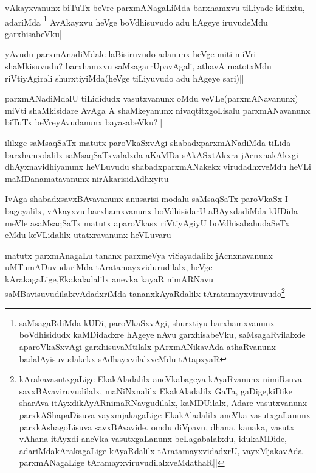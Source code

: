 \begin{artha}
vAkayxvanunx biTuTx beVre parxmANagaLiMda barxhamxvu tiLiyade ididxtu, adariMda \footnote{saMsagaRdiMda kUDi, paroVkaSxvAgi, shurxtiyu barxhamxvanunx boVdhisidudx kaMDidadxre hAgeye nAvu garxhisabeVku, saMsagaRvilalxde aparoVkaSxvAgi garxhisuvaMtilalx pArxmANikavAda athaRvanunx badalAyisuvudakekx sAdhayxvilalxveMdu tAtapxyaR} AvAkayxvu heVge boVdhisuvudo adu hAgeye iruvudeMdu garxhisabeVku||
\end{artha}


\begin{artha}
yAvudu parxmAnadiMdale laBisiruvudo adanunx heVge miti miVri shaMkisuvudu? barxhamxvu saMsagarrUpavAgali, athavA matotxMdu riVtiyAgirali shurxtiyiMda(heVge tiLiyuvudo adu hAgeye sari)||
\end{artha}

\begin{artha}
parxmANadiMdalU tiLididudx vasutxvanunx oMdu veVLe(parxmANavanunx) miVti shaMkisidare AvAga A shaMkeyanunx nivaqtitxgoLisalu parxmANavanunx biTuTx beVreyAvudanunx bayasabeVku?||
\end{artha}

\begin{artha}
ililxge saMsaqSaTx matutx paroVkaSxvAgi shabadxparxmANadiMda tiLida barxhamxdalilx saMsaqSaTxvalalxda aKaMDa sAkASxtAkxra jAcnxnakAkxgi dhAyxnavidhiyanunx heVLuvudu shabadxparxmANakekx virudadhxveMdu heVLi maMDanamatavanunx nirAkarisidAdhxyitu
\end{artha}

\begin{artha}
IvAga shabadxsavxBAvavanunx anusarisi modalu saMsaqSaTx paroVkaSx I bageyalilx, vAkayxvu barxhamxvanunx boVdhisidarU aBAyxdadiMda kUDida meVle asaMsaqSaTx matutx aparoVkasx riVtiyAgiyU boVdhisabahudaSeTx eMdu keVLidalilx utatxravanunx heVLuvaru--
\end{artha}

\begin{artha}
matutx parxmAnagaLu tananx parxmeVya viSayadalilx jAcnxnavanunx uMTumADuvudariMda tAratamayxvidurudilalx, heVge kArakagaLige,Ekakaladalilx anevka kayaR nimARNavu saMBavisuvudilalxvAdadxriMda tananxkAyaRdalilx tAratamayxviruvudo\footnote{kArakavasutxgaLige EkakAladalilx aneVkabageya kAyaRvanunx nimiRsuva savxBAvaviruvudilalx, maNiNxnalilx EkakAladalilx GaTa, gaDige,kiDike sharAva itAyxdikAyARnimaRNavgudilalx, kaMDUilalx, Adare vasutxvanunx parxkAShapaDisuva vayxmjakagaLige EkakAladalilx aneVka vasutxgaLanunx parxkAshagoLisuva savxBAvavide. omdu diVpavu, dhana, kanaka, vasutx vAhana itAyxdi aneVka vasutxgaLanunx beLagabalalxdu, idukaMDide, adariMdakArakagaLige kAyaRdalilx tAratamayxvidadxrU, vayxMjakavAda parxmANagaLige tAramayxviruvudilalxveMdathaR||} 
\end{artha}

